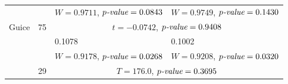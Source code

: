\documentclass[twoside,a4paper,11pt]{memoir}
\begin{document}
\begin{table}[]
\begin{adjustbox}{center}
\begin{tabular}{llll}
 &  & $W = 0.9711$, $p\emph{-value} = 0.0843$ & $W = 0.9749$, $p\emph{-value} = 0.1430$ \\
\multirow{-3}{*}{Guice} & \multirow{-3}{*}{75} & \multicolumn{2}{c}{$t = -0.0742$, $p\emph{-value} = 0.9408$} \\
\rowcolor{Gray}
\cellcolor{Gray} & \cellcolor{Gray} & 0.1078 & 0.1002 \\
\rowcolor{Gray}
\cellcolor{Gray} & \cellcolor{Gray} & $W = 0.9178$, $p\emph{-value} = 0.0268$ & $W = 0.9208$, $p\emph{-value} = 0.0320$ \\
\rowcolor{Gray}
\multirow{-3}{*}{\cellcolor{Gray}Jsoup} & \multirow{-3}{*}{\cellcolor{Gray}29} & \multicolumn{2}{c}{\cellcolor{Gray}$T = 176.0$, $p\emph{-value} = 0.3695$}\\
\bottomrule
\end{tabular}
\end{adjustbox}
\end{table}
\end{document}
